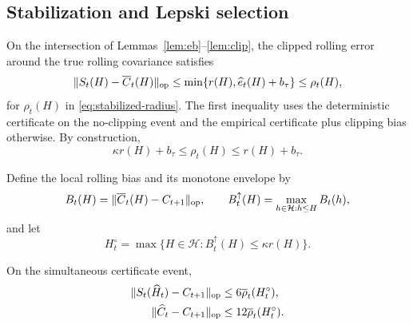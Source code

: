 \subsection{Stabilization and Lepski selection}

On the intersection of Lemmas~\ref{lem:eb}--\ref{lem:clip}, the clipped rolling error around the true rolling covariance satisfies
\begin{equation}
 \|S_t(H)-\overline C_t(H)\|_{\mathrm{op}}
 \le \min\{r(H),\widehat e_t(H)+b_\tau\}
 \le \rho_t(H),
 \label{eq:joint-certificate}
\end{equation}
for $\rho_t(H)$ in \eqref{eq:stabilized-radius}.  The first inequality uses the deterministic certificate on the no-clipping event and the empirical certificate plus clipping bias otherwise.  By construction,
\begin{equation}
 \kappa r(H)+b_\tau\le\rho_t(H)\le r(H)+b_\tau.
 \label{eq:rho-sandwich}
\end{equation}

Define the local rolling bias and its monotone envelope by
\begin{equation}
 B_t(H)=\|\overline C_t(H)-C_{t+1}\|_{\mathrm{op}},\qquad
 B_t^\uparrow(H)=\max_{h\in\mathcal H:h\le H}B_t(h),
\end{equation}
and let
\begin{equation}
 H_t^\circ=\max\{H\in\mathcal H:B_t^\uparrow(H)\le\kappa r(H)\}.
 \label{eq:balancing-window-app}
\end{equation}

\begin{theorem}
\label{thm:oracle-app}
On the simultaneous certificate event,
\begin{align}
 \|S_t(\widehat H_t)-C_{t+1}\|_{\mathrm{op}}&\le6\overline\rho_t(H_t^\circ),\\
 \|\widehat C_t-C_{t+1}\|_{\mathrm{op}}&\le12\overline\rho_t(H_t^\circ).
 \label{eq:oracle-app}
\end{align}
\end{theorem}

